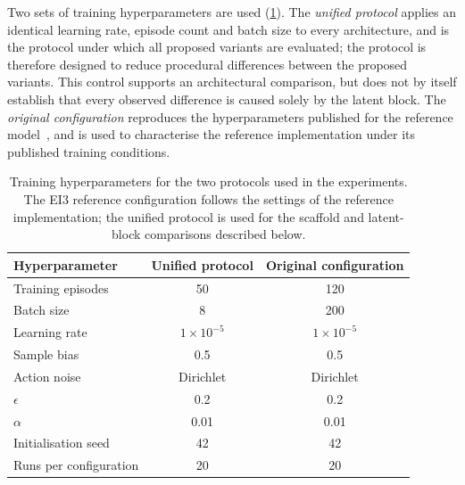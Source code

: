 \documentclass[aps,floatfix,superscriptaddress,twocolumn,tightenlines,amsmath,amssymb,nofootinbib,10pt,longbibliography,prl]{revtex4-2}
\begin{document}
Two sets of training hyperparameters are used (\ref{tab:hyperparams}). The
\emph{unified protocol} applies an identical learning rate, episode count and
batch size to every architecture, and is the protocol under which all proposed variants are
evaluated; the protocol is therefore designed to reduce procedural differences between the
proposed variants. This control supports an architectural comparison, but does not by itself
establish that every observed difference is caused solely by the latent block. The
\emph{original configuration} reproduces the hyperparameters published for the reference
model~\cite{RLportfolio}, and is used to characterise the reference implementation under its
published training conditions.


\begin{table}[htbp]
  \centering
  \caption{Training hyperparameters for the two protocols used in the experiments. The EI3 reference
  configuration follows the settings of the reference implementation; the unified protocol
  is used for the scaffold and latent-block comparisons described below.}
  \label{tab:hyperparams}
  \begin{tabular}{lcc}
    \toprule
    Hyperparameter & Unified protocol & Original configuration \\
    \midrule
    Training episodes      & 50                & 120 \\
    Batch size             & 8                 & 200 \\
    Learning rate          & $1\times10^{-5}$  & $1\times10^{-5}$ \\
    Sample bias            & 0.5               & 0.5 \\
    Action noise           & Dirichlet         & Dirichlet \\
    \quad $\epsilon$       & 0.2               & 0.2 \\
    \quad $\alpha$         & 0.01              & 0.01 \\
    Initialisation seed    & 42                & 42 \\
    Runs per configuration & 20                & 20 \\
    \bottomrule
  \end{tabular}
  \\[3pt]
\end{table}
\end{document}
